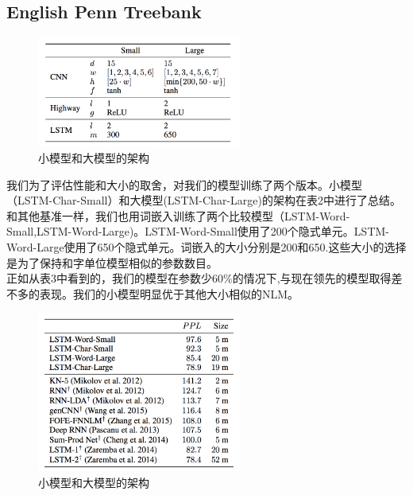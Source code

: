 \subsection{English Penn Treebank}
\begin{figure}[h]
  \centering
  \includegraphics[width=0.6\textwidth]{./images/table2}
  \caption{小模型和大模型的架构}
\end{figure}
我们为了评估性能和大小的取舍，对我们的模型训练了两个版本。小模型（LSTM-Char-Small）和大模型(LSTM-Char-Large)的架构在表2中进行了总结。\\
和其他基准一样，我们也用词嵌入训练了两个比较模型（LSTM-Word-Small,LSTM-Word-Large)。LSTM-Word-Small使用了200个隐式单元。LSTM-Word-Large使用了650个隐式单元。词嵌入的大小分别是200和650.这些大小的选择是为了保持和字单位模型相似的参数数目。\\
正如从表3中看到的，我们的模型在参数少60\%的情况下,与现在领先的模型取得差不多的表现。我们的小模型明显优于其他大小相似的NLM。\\
\begin{figure}[h]
  \centering
  \includegraphics[width=0.6\textwidth]{./images/table3}
  \caption{小模型和大模型的架构}
\end{figure}

